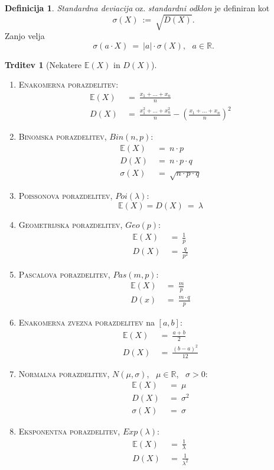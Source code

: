 \documentclass[11pt]{article}
\theoremstyle{definition}
\newtheorem{definicija}{Definicija}[section]
\theoremstyle{definition}
\newtheorem{trditev}{Trditev}[section]
\theoremstyle{definition}
\begin{document}
\begin{definicija}

\textit{Standardna deviacija} oz. \textit{standardni odklon} je definiran kot
$$\sigma(X) ~:=~ \sqrt{D(X)}.$$
Zanjo velja
$$\sigma(a \cdot X) ~=~ |a| \cdot \sigma(X), ~~~a \in \mathbb{R}.$$

\end{definicija}
\vspace{0.5cm}

\begin{trditev}[Nekatere $\mathbb{E}(X)$ in $D(X)$]
~
\begin{enumerate}
	\item \textsc{Enakomerna porazdelitev}:
	\begin{align*}
	\mathbb{E}(X) ~&=~ \frac{x_1 + \ldots + x_n}{n} \\
	D(X) ~&=~ \frac{x_1^2 + \ldots + x_n^2}{n} - \left( \frac{x_1 + \ldots + x_n}{n} \right)^2
	\end{align*}
	\item \textsc{Binomska porazdelitev}, $Bin(n, p)$:
	\begin{align*}
	\mathbb{E}(X) ~&=~ n \cdot p \\
	D(X) ~&=~ n \cdot p \cdot q \\
	\sigma(X) ~&=~ \sqrt{n \cdot p \cdot q}
	\end{align*}
	\item \textsc{Poissonova porazdelitev}, $Poi(\lambda)$:
	$$\mathbb{E}(X) = D(X) ~=~ \lambda$$
	\item \textsc{Geometrijska porazdelitev}, $Geo(p)$:
	\begin{align*}
	\mathbb{E}(X) ~&=~ \frac{1}{p} \\
	D(X) ~&=~ \frac{q}{p^2}
	\end{align*}
	\item \textsc{Pascalova porazdelitev}, $Pas(m, p)$:
	\begin{align*}
	\mathbb{E}(X) ~&=~ \frac{m}{p} \\
	D(x) ~&=~ \frac{m \cdot q}{p}
	\end{align*}
	\item \textsc{Enakomerna zvezna porazdelitev} na $[a, b]$:
	\begin{align*}
	\mathbb{E}(X) ~&=~ \frac{a + b}{2} \\
	D(X) ~&=~ \frac{(b-a)^2}{12}
	\end{align*}
	\item \textsc{Normalna porazdelitev}, $N(\mu, \sigma)$, ~$\mu \in \mathbb{R}$, ~$\sigma > 0$:
	\begin{align*}
	\mathbb{E}(X) ~&=~ \mu \\
	D(X) ~&=~ \sigma^2 \\
	\sigma(X) ~&=~ \sigma
	\end{align*}
	\item \textsc{Eksponentna porazdelitev}, $Exp(\lambda)$:
	\begin{align*}
	\mathbb{E}(X) ~&=~ \frac{1}{\lambda} \\
	D(X) ~&=~ \frac{1}{\lambda^2}
	\end{align*}
\end{enumerate}

\end{trditev}
\end{document}
